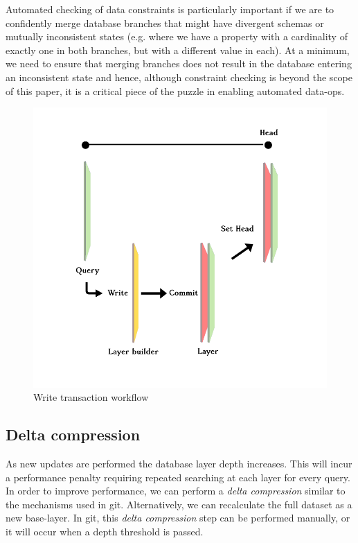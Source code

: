 \documentclass[10pt, a4paper, twocolumn]{article} %
\begin{document}
Automated checking of data constraints is particularly important if we
are to confidently merge database branches that might have divergent
schemas or mutually inconsistent states (e.g. where we have a property
with a cardinality of exactly one in both branches, but with a
different value in each). At a minimum, we need to ensure that merging
branches does not result in the database entering an inconsistent
state and hence, although constraint checking is beyond the scope of
this paper, it is a critical piece of the puzzle in enabling automated
data-ops\autocite{gleason2018}.

\begin{figure}
	\includegraphics[width=\linewidth]{query_write_commit_head} %
	\caption{Write transaction workflow} %
	\label{workflow} %
\end{figure}


\subsection{Delta compression}

As new updates are performed the database layer depth increases. This
will incur a performance penalty requiring repeated searching at each
layer for every query. In order to improve performance, we can perform
a {\em delta compression} similar to the mechanisms used in
git. Alternatively, we can recalculate the full dataset as a new
base-layer. In git, this {\em delta compression} step can be performed
manually, or it will occur when a depth threshold is passed.
\end{document}
